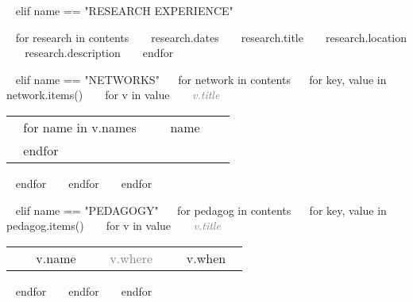 \begin{minipage}{\textwidth}

~{ elif name == "RESEARCH EXPERIENCE" }~
\begin{entrylist}
~{ for research in contents }~
  \entry
    {~{{ research.dates }}~}
    {~{{ research.title }}~}
    {~{{ research.location }}~}
    {~{{ research.description }}~}
~{ endfor }~
\end{entrylist}

% 

~{ elif name == "NETWORKS" }~
~{for network in contents}~
  ~{ for key, value in network.items() }~
    ~{ for v in value }~
       \textcolor{gray}{{\emph{~{{ v.title }}~}}} 
       \begin{tabular}{ p{} %
                        p{} 
                        p{}} %
      ~{ for name in v.names }~ 
      \small &  ~{{ name }}~ & {\hfill}\\ 
      ~{ endfor }~
      \end{tabular}
    ~{ endfor }~
  ~{ endfor }~
~{ endfor }~ 


%

~{ elif name == "PEDAGOGY" }~
~{for pedagog in contents}~
  ~{ for key, value in pedagog.items() }~
    ~{ for v in value }~
        \textcolor{gray}{{\emph{~{{ v.title }}~}}} 
        \begin{tabular}{ p{} %
                        p{}
                        p{} 
                        p{}} %
        \small &  ~{{ v.name }}~ & {\hfill}\textcolor{gray}{\small{~{{ v.where }}~}} & {\hfill}\small{~{{ v.when }}~}\\ 
        \end{tabular}
      ~{ endfor }~
  ~{ endfor }~
~{ endfor }~ 


\end{minipage}
